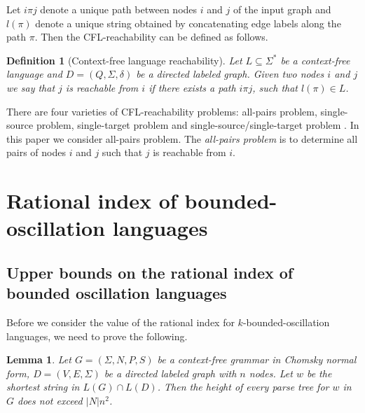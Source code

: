 \documentclass[11pt,a4paper]{article} %
\newtheorem{lemma}{Lemma}
\newtheorem{definition}{Definition}
\begin{document}
Let $i\pi j$ denote a unique path between nodes $i$ and $j$ of the input graph and $l(\pi)$ denote a unique string obtained by concatenating edge labels along the path $\pi$. Then the CFL-reachability can be defined as follows.
\begin{definition}[Context-free language reachability]
Let $L \subseteq \Sigma^*$ be a context-free language and $D = (Q, \Sigma, \delta)$ be a directed labeled graph. Given two nodes $i$ and $j$ we say that $j$ is \textit{reachable} from $i$ if there exists a path $i \pi j$, such that $l(\pi) \in L$. 
\end{definition}
There are four varieties of CFL-reachability problems: all-pairs problem, single-source problem, single-target problem and single-source/single-target problem \cite{RepsBasic}. In this paper we consider all-pairs problem. The \textit{all-pairs problem} is to determine all pairs of nodes $i$ and $j$ such that $j$ is reachable from $i$. 





\section{Rational index of bounded-oscillation languages}
\label{sec:osc}
\subsection{Upper bounds on the rational index of bounded oscillation languages}
Before we consider the value of the rational index for $k$-bounded-oscillation languages, we need to prove the following.
\begin{lemma}
\label{lem:treeheight}
Let  $G = (\Sigma, N, P, S)$ be a context-free grammar in Chomsky normal form,  $D=(V, E, \Sigma)$ be a directed labeled graph with $n$ nodes. Let $w$ be the shortest string in $L(G)\cap L(D)$. Then the height of every parse tree for $w$ in $G$ does not exceed $|N|n^2$.
\end{lemma}
\end{document}
